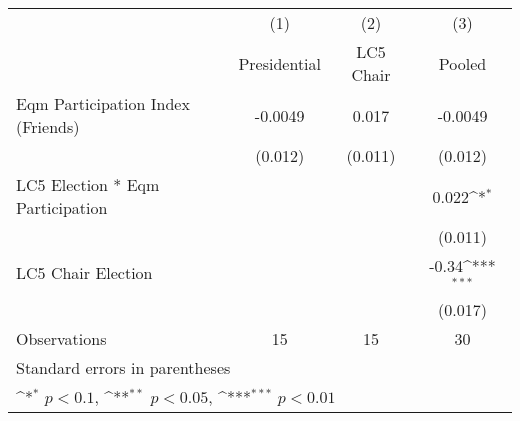 {
\def\sym#1{\ifmmode^{#1}\else\(^{#1}\)\fi}
\begin{tabular}{l*{3}{c}}
\toprule
                &\multicolumn{1}{c}{(1)}&\multicolumn{1}{c}{(2)}&\multicolumn{1}{c}{(3)}\\
                &\multicolumn{1}{c}{Presidential}&\multicolumn{1}{c}{LC5 Chair}&\multicolumn{1}{c}{Pooled}\\
\midrule
Eqm Participation Index (Friends)&  -0.0049         &    0.017         &  -0.0049         \\
                &  (0.012)         &  (0.011)         &  (0.012)         \\
LC5 Election * Eqm Participation&                  &                  &    0.022\sym{*}  \\
                &                  &                  &  (0.011)         \\
LC5 Chair Election&                  &                  &    -0.34\sym{***}\\
                &                  &                  &  (0.017)         \\
\midrule
Observations    &       15         &       15         &       30         \\
\bottomrule
\multicolumn{4}{l}{\footnotesize Standard errors in parentheses}\\
\multicolumn{4}{l}{\footnotesize \sym{*} \(p<0.1\), \sym{**} \(p<0.05\), \sym{***} \(p<0.01\)}\\
\end{tabular}
}
